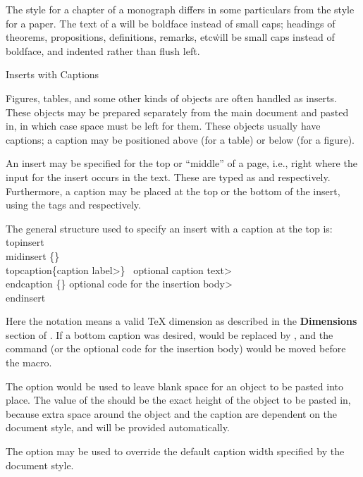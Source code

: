 The style for a chapter of a monograph differs in some particulars from the
style for a paper.  The text of a  will be boldface instead of
small caps; headings of theorems, propositions, definitions, remarks, etc\.
will be small caps instead of boldface, and indented rather than flush
left.


\subhead Inserts with Captions \endsubhead

Figures, tables, and some other kinds of objects are often handled as
inserts.  These objects may be prepared separately from the main document
and pasted in, in which case space must be left for them.
These objects usually have captions; a caption may be positioned above (for
a table) or below (for a figure).

An insert may be specified for the top or ``middle'' of a page, i.e.,
right where the input for the insert occurs in the text.  These are
typed as  and  respectively.
Furthermore, a caption may be placed at the top or the bottom of the insert,
using the tags  and  respectively.

The general structure used to specify an insert with a caption at the top is:
\beginexample{}
\\topinsert{}\quad \\midinsert
{}\{\Dimen\}
\\topcaption\{\<caption label>\}
\ \<optional caption text>
\\endcaption
{}\{\Dimen\}\quad%
  \<optional code for the insertion body>
\\endinsert
\endexample

Here the notation \Dimen{} means a valid \TeX{} dimension as
described in the {\bf Dimensions} section of \JoT{}.
If a bottom caption was desired,  would be replaced by
, and
the  command (or the
optional code for the insertion body) would be moved before the
 macro.

The  option would be used to leave blank space for
an object to be pasted into place.  The value of the \Dimen{} should be
the exact height of the object to be pasted in, because extra space
around the object and the caption are dependent on the document style,
and will be provided automatically.

The  option may be used to override the default
caption width specified by the document style.

